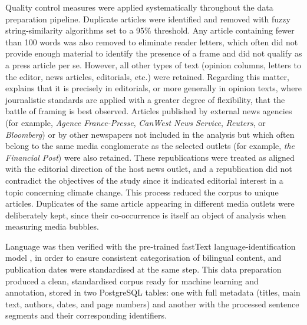 \documentclass[12pt]{article}
\renewcommand\_{\texttt{\detokenize{_}\allowbreak}}
\begin{document}
Quality control measures were applied systematically throughout the data preparation pipeline. Duplicate articles were identified and removed with fuzzy string-similarity algorithms set to a 95\% threshold. Any article containing fewer than 100 words was also removed  to eliminate reader letters, which often did not provide enough material to identify the presence of a frame and did not qualify as a press article per se. However, all other types of text (opinion columns, letters to the editor, news articles, editorials, etc.) were retained. Regarding this matter, \textcite{lawrence_framing_2004} explains that it is precisely in editorials, or more generally in opinion texts, where journalistic standards are applied with a greater degree of flexibility, that the battle of framing is best observed. Articles published by external news agencies (for example, \textit{Agence France-Presse}, \textit{CanWest News Service}, \textit{Reuters}, or \textit{Bloomberg}) or by other newspapers not included in the analysis but which often belong to the same media conglomerate as the selected outlets (for example, \textit{the Financial Post}) were also retained. These republications were treated as aligned with the editorial direction of the host news outlet, and a republication did not contradict the objectives of the study since it indicated editorial interest in a topic concerning climate change. This process reduced the corpus to \CCFarticles{} unique articles. Duplicates of the same article appearing in different media outlets were deliberately kept, since their co-occurrence is itself an object of analysis when measuring media bubbles.

Language was then verified with the pre-trained fastText language-identification model \autocite{joulin_bag_2017, joulin_fasttext_2016}, in order to ensure consistent categorisation of bilingual content, and publication dates were standardised at the same step. This data preparation produced a clean, standardised corpus ready for machine learning and annotation, stored in two PostgreSQL tables: one with full metadata (titles, main text, authors, dates, and page numbers) and another with the processed sentence segments and their corresponding identifiers.
\end{document}

